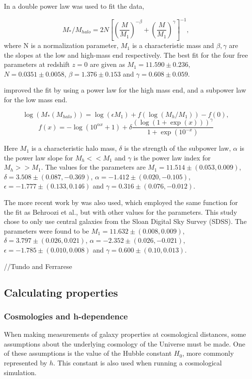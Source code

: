 In \cite{Moster2012} a double power law was used to fit the data,

\begin{equation}
	M_{*}/M_{halo} = 2 N[(\frac{M}{M_1})^{-\beta}+(\frac{M}{M_1})^{\gamma}]^{-1},
\end{equation}
where N is a normalization parameter, $M_1$ is a characteristic mass and $\beta, \gamma$ are the slopes at the low and high-mass end respectively. The best fit for the four free parameters at redshift $z=0$ are given as $M_1 = 11.590 \pm 0.236$, $N = 0.0351 \pm 0.0058$, $\beta = 1.376 \pm 0.153$ and $\gamma = 0.608 \pm 0.059$.

\cite{Behroozi2013} improved the fit by using a power law for the high mass end, and a subpower law for the low mass end.

\begin{equation} \label{eq_behroozi}
    \log(M_*(M_{halo})) = \log(\epsilon M_1) + f(\log(M_h/M_1)) -f(0),
\end{equation}
\begin{equation*}
    f(x) = -\log(10^{\alpha x}+1)+\delta \frac{(\log(1+\exp(x)))^\gamma}{1 +\exp(10^{-x})}
\end{equation*}

Here $M_1$ is a characteristic halo mass, $\delta$ is the strength of the subpower law, $\alpha$ is the power law slope for $M_h << M_1$ and $\gamma$ is the power law index for $M_h >> M_1$. The values for the parameters are $M_1 = 11.514\pm(0.053, 0.009)$, $\delta = 3.508 \pm (0.087, -0.369)$, $\alpha = -1.412 \pm (0.020, -0.105)$, $\epsilon = -1.777 \pm (0.133, 0.146)$ and $\gamma = 0.316 \pm (0.076, -0.012)$.

The more recent work by \cite{Zanisi2019} was also used, which employed the same function for the fit as Behroozi et al., but with other values for the parameters. This study chose to only use central galaxies from the Sloan Digital Sky Survey (SDSS). The parameters were found to be $M_1 = 11.632\pm(0.008, 0.009)$, $\delta = 3.797 \pm (0.026, 0.021)$, $\alpha = -2.352 \pm (0.026, -0.021)$, $\epsilon = -1.785 \pm (0.010, 0.008)$  and $\gamma = 0.600 \pm (0.10, 0.013)$.

//Tundo and Ferrarese


\subsection{Calculating properties}

\subsubsection{Cosmologies and h-dependence} \label{cosmologies}
When making measurements of galaxy properties at cosmological distances, some assumptions about the underlying cosmology of the Universe must be made. One of these assumptions is the value of the Hubble constant $H_0$, more commonly represented by $h$. This constant is also used when running a cosmological simulation. 

